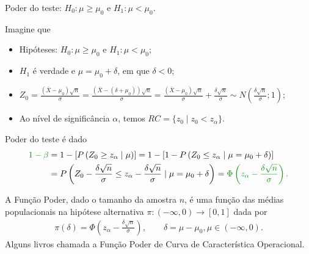 \documentclass[8pt]{beamer}
\begin{document}
\begin{frame}{Poder do teste: $H_0:\mu \geq \mu_0$ e $H_1: \mu < \mu_0$.}

\normalsize

Imagine que
\begin{itemize}
	\item Hipóteses: $H_0: \mu \geq \mu_0$ e $H_1: \mu < \mu_0$;
	\item $H_1$ é verdade e $\mu = \mu_0 + \delta$, em que $\delta < 0$;
	\item $Z_0 = \frac{(\bar{X} - \mu_0)\sqrt{n}}{\sigma} = \frac{(\bar{X} - (\delta + \mu_0))\sqrt{n}}{\sigma} = \frac{(\bar{X} - \mu_0)\sqrt{n}}{\sigma} + \frac{\delta\sqrt{n}}{\sigma} \sim N\left( \frac{\delta \sqrt{n}}{\sigma}; 1 \right)$;
	\item Ao nível de significância $\alpha$, temos $RC = \{ z_0 \mid z_0 < z_{\alpha}   \}$.
\end{itemize}
\vfill	

Poder do teste é dado
\begin{align*}
\textcolor{important}{1-\beta} &=1 - \left[P\left( Z_0 \geq z_{ \alpha} \mid \mu \right)\right] = 1- \left[1 - P \left( Z_0 \leq z_{ \alpha} \mid \mu = \mu_0 + \delta \right)\right]\\
&=   P \left( Z_0 - \frac{\delta \sqrt{n}}{\sigma} \leq z_{ \alpha} - \frac{\delta \sqrt{n}}{\sigma} \mid \mu = \mu_0 + \delta \right)= \textcolor{important}{\Phi\left( z_{\alpha} - \frac{\delta \sqrt{n}}{\sigma} \right).}
\end{align*}
\vfill

A \textcolor{important}{Função Poder}, dado o tamanho da amostra $n$, é uma função das médias populacionais na hipótese alternativa  $\pi: (-\infty, 0) \longrightarrow [0,1]$ dada por
\begin{align*}
\pi(\delta) =  \Phi\left( z_{\alpha} - \frac{\delta \sqrt{n}}{\sigma} \right), \qquad \delta = \mu - \mu_0, \mu \in (-\infty, 0).
\end{align*}
Alguns livros chamada a Função Poder de \textcolor{important}{Curva de Característica Operacional.}

\normalsize	
\end{frame}
\end{document}
